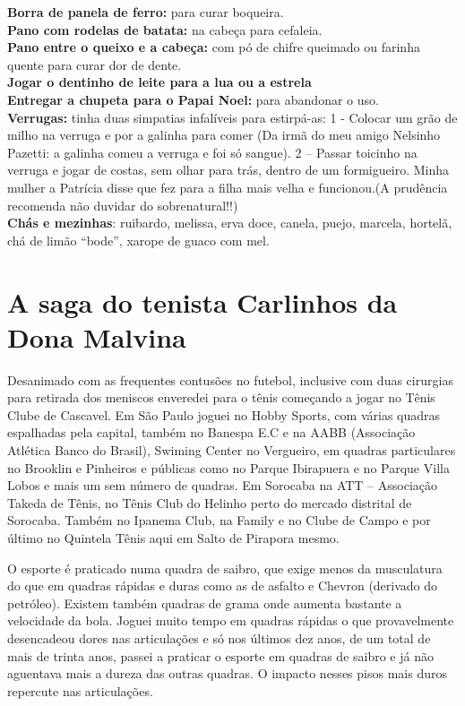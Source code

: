 \documentclass[12pt,brazil,]{book}
\begin{document}
\textbf{Borra de panela de ferro:} para curar boqueira.\\
\textbf{Pano com rodelas de batata:} na cabeça para cefaleia.\\
\textbf{Pano entre o queixo e a cabeça:} com pó de chifre queimado ou
farinha quente para curar dor de dente.\\
\textbf{Jogar o dentinho de leite para a lua ou a estrela}\\
\textbf{Entregar a chupeta para o Papai Noel:} para abandonar o uso.\\
\textbf{Verrugas:} tinha duas simpatias infalíveis para estirpá-as: 1 -
Colocar um grão de milho na verruga e por a galinha para comer (Da irmã
do meu amigo Nelsinho Pazetti: a galinha comeu a verruga e foi só
sangue). 2 -- Passar toicinho na verruga e jogar de costas, sem olhar
para trás, dentro de um formigueiro. Minha mulher a Patrícia disse que
fez para a filha mais velha e funcionou.(A prudência recomenda não
duvidar do sobrenatural!!)\\
\textbf{Chás e mezinhas}: ruibardo, melissa, erva doce, canela, puejo,
marcela, hortelã, chá de limão ``bode'', xarope de guaco com mel.

\section{A saga do tenista Carlinhos da Dona
Malvina}\label{a-saga-do-tenista-carlinhos-da-dona-malvina}

Desanimado com as frequentes contusões no futebol, inclusive com duas
cirurgias para retirada dos meniscos enveredei para o tênis começando a
jogar no Tênis Clube de Cascavel. Em São Paulo joguei no Hobby Sports,
com várias quadras espalhadas pela capital, também no Banespa E.C e na
AABB (Associação Atlética Banco do Brasil), Swiming Center no Vergueiro,
em quadras particulares no Brooklin e Pinheiros e públicas como no
Parque Ibirapuera e no Parque Villa Lobos e mais um sem número de
quadras. Em Sorocaba na ATT -- Associação Takeda de Tênis, no Tênis Club
do Helinho perto do mercado distrital de Sorocaba. Também no Ipanema
Club, na Family e no Clube de Campo e por último no Quintela Tênis aqui
em Salto de Pirapora mesmo.

O esporte é praticado numa quadra de saibro, que exige menos da
musculatura do que em quadras rápidas e duras como as de asfalto e
Chevron (derivado do petróleo). Existem também quadras de grama onde
aumenta bastante a velocidade da bola. Joguei muito tempo em quadras
rápidas o que provavelmente desencadeou dores nas articulações e só nos
últimos dez anos, de um total de mais de trinta anos, passei a praticar
o esporte em quadras de saibro e já não aguentava mais a dureza das
outras quadras. O impacto nesses pisos mais duros repercute nas
articulações.
\end{document}
